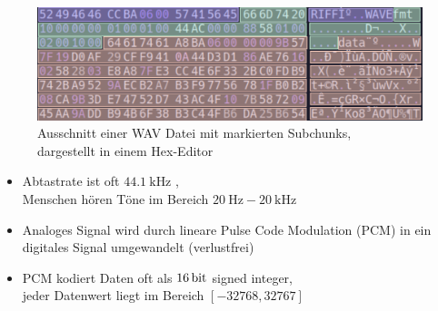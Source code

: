 \begin{frame}{\insertsection}
	\begin{figure}
		\includegraphics[scale=0.125]{images/wav_hex.png}
		\caption{\centering Ausschnitt einer WAV Datei mit markierten Subchunks,\\dargestellt in einem Hex-Editor}
	\end{figure}
	\begin{itemize}
		\item Abtastrate ist oft $\SI{44.1}{\kilo\hertz}$ ,
		\\  Menschen hören Töne im Bereich $\SI{20}{\hertz}-\SI{20}{\kilo\hertz}$ 
		\item Analoges Signal wird durch lineare Pulse Code Modulation (PCM)  in ein digitales Signal umgewandelt (verlustfrei)
		\item PCM kodiert Daten oft als $\SI{16}{\bit}$ signed integer,
		\\ jeder Datenwert liegt im Bereich $[-32768, 32767]$ %
	\end{itemize}
\end{frame}